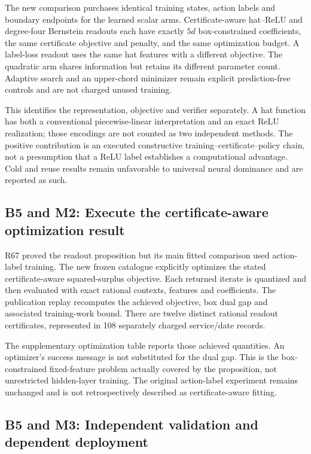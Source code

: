 \documentclass[ecta,nameyear,draft]{econsocart}
\begin{document}
The new comparison purchases identical training states, action labels
and boundary endpoints for the learned scalar arms. Certificate-aware
hat--ReLU and degree-four Bernstein readouts each have exactly \(5d\)
box-constrained coefficients, the same certificate objective and
penalty, and the same optimization budget. A label-loss readout uses the
same hat features with a different objective. The quadratic arm shares
information but retains its different parameter count. Adaptive search
and an upper-chord minimizer remain explicit prediction-free controls
and are not charged unused training.

This identifies the representation, objective and verifier separately. A
hat function has both a conventional piecewise-linear interpretation and
an exact ReLU realization; those encodings are not counted as two
independent methods. The positive contribution is an executed
constructive training--certificate--policy chain, not a presumption that
a ReLU label establishes a computational advantage. Cold and reuse
results remain unfavorable to universal neural dominance and are
reported as such.

\hypertarget{b5-and-m2-execute-the-certificate-aware-optimization-result}{%
\subsection{B5 and M2: Execute the certificate-aware optimization
result}\label{b5-and-m2-execute-the-certificate-aware-optimization-result}}

R67 proved the readout proposition but its main fitted comparison used
action-label training. The new frozen catalogue explicitly optimizes the
stated certificate-aware squared-surplus objective. Each returned
iterate is quantized and then evaluated with exact rational contexts,
features and coefficients. The publication replay recomputes the
achieved objective, box dual gap and associated training-work bound.
There are twelve distinct rational readout certificates, represented in
108 separately charged service/date records.

The supplementary optimization table reports those achieved quantities.
An optimizer's success message is not substituted for the dual gap. This
is the box-constrained fixed-feature problem actually covered by the
proposition, not unrestricted hidden-layer training. The original
action-label experiment remains unchanged and is not retrospectively
described as certificate-aware fitting.

\hypertarget{b5-and-m3-independent-validation-and-dependent-deployment}{%
\subsection{B5 and M3: Independent validation and dependent
deployment}\label{b5-and-m3-independent-validation-and-dependent-deployment}}
\end{document}
